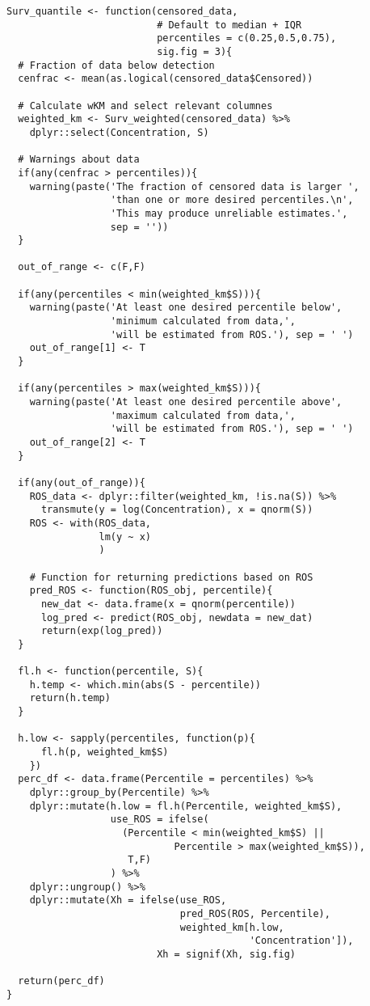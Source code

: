 \begin{snugshade}
\begin{verbatim}
Surv_quantile <- function(censored_data,
                          # Default to median + IQR
                          percentiles = c(0.25,0.5,0.75),
                          sig.fig = 3){
  # Fraction of data below detection
  cenfrac <- mean(as.logical(censored_data$Censored))
  
  # Calculate wKM and select relevant columnes
  weighted_km <- Surv_weighted(censored_data) %>%
    dplyr::select(Concentration, S)
  
  # Warnings about data
  if(any(cenfrac > percentiles)){
    warning(paste('The fraction of censored data is larger ',
                  'than one or more desired percentiles.\n',
                  'This may produce unreliable estimates.',
                  sep = ''))
  }
  
  out_of_range <- c(F,F)
  
  if(any(percentiles < min(weighted_km$S))){
    warning(paste('At least one desired percentile below', 
                  'minimum calculated from data,', 
                  'will be estimated from ROS.'), sep = ' ')
    out_of_range[1] <- T
  }
  
  if(any(percentiles > max(weighted_km$S))){
    warning(paste('At least one desired percentile above', 
                  'maximum calculated from data,', 
                  'will be estimated from ROS.'), sep = ' ')
    out_of_range[2] <- T
  }
  
  if(any(out_of_range)){
    ROS_data <- dplyr::filter(weighted_km, !is.na(S)) %>%
      transmute(y = log(Concentration), x = qnorm(S))
    ROS <- with(ROS_data,
                lm(y ~ x)
                )
    
    # Function for returning predictions based on ROS
    pred_ROS <- function(ROS_obj, percentile){
      new_dat <- data.frame(x = qnorm(percentile))
      log_pred <- predict(ROS_obj, newdata = new_dat)
      return(exp(log_pred))
  }
  
  fl.h <- function(percentile, S){
    h.temp <- which.min(abs(S - percentile))
    return(h.temp)
  }
  
  h.low <- sapply(percentiles, function(p){
      fl.h(p, weighted_km$S)
    })
  perc_df <- data.frame(Percentile = percentiles) %>%  
    dplyr::group_by(Percentile) %>%
    dplyr::mutate(h.low = fl.h(Percentile, weighted_km$S),
                  use_ROS = ifelse(
                    (Percentile < min(weighted_km$S) ||
                             Percentile > max(weighted_km$S)),
                     T,F)
                  ) %>%
    dplyr::ungroup() %>%
    dplyr::mutate(Xh = ifelse(use_ROS,
                              pred_ROS(ROS, Percentile),
                              weighted_km[h.low,
                                          'Concentration']),
                          Xh = signif(Xh, sig.fig)

  return(perc_df)
}
\end{verbatim}
\end{snugshade}

